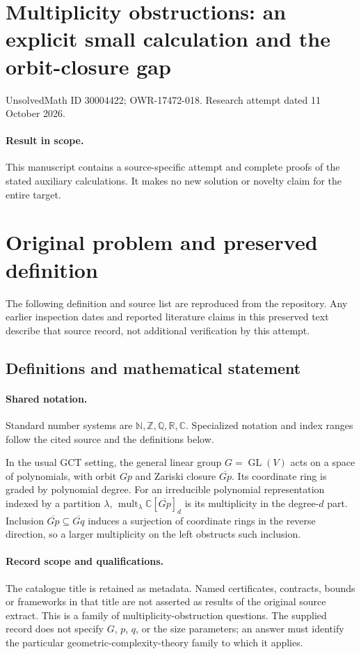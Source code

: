 \documentclass[11pt]{article}
\begin{document}
\section*{Multiplicity obstructions: an explicit small calculation and the orbit-closure gap}
\noindent UnsolvedMath ID 30004422; OWR-17472-018. Research attempt dated 11 October 2026.
\paragraph{Result in scope.}This manuscript contains a source-specific attempt and complete proofs of the stated auxiliary calculations. It makes no new solution or novelty claim for the entire target.
\section{Original problem and preserved definition}
The following definition and source list are reproduced from the repository. Any earlier inspection dates and reported literature claims in this preserved text describe that source record, not additional verification by this attempt.
\subsection{Definitions and mathematical statement}

\paragraph{Shared notation.}Standard number systems are $\mathbb N,\mathbb Z,\mathbb Q,\mathbb R,\mathbb C$. Specialized notation and index ranges follow the cited source and the definitions below.


In the usual GCT setting, the general linear group $G=\operatorname{GL}(V)$ acts on a space of polynomials, with orbit $Gp$ and Zariski closure $\overline{Gp}$. Its coordinate ring is graded by polynomial degree. For an irreducible polynomial representation indexed by a partition $\lambda$, $\operatorname{mult}_\lambda\mathbb C[\overline{Gp}]_d$ is its multiplicity in the degree-$d$ part. Inclusion $\overline{Gp}\subseteq\overline{Gq}$ induces a surjection of coordinate rings in the reverse direction, so a larger multiplicity on the left obstructs such inclusion.
\paragraph{Record scope and qualifications.}
The catalogue title is retained as metadata. Named certificates, contracts, bounds or frameworks in that title are not asserted as results of the original source extract.
This is a family of multiplicity-obstruction questions. The supplied record does not specify $G$, $p$, $q$, or the size parameters; an answer must identify the particular geometric-complexity-theory family to which it applies.
\end{document}
